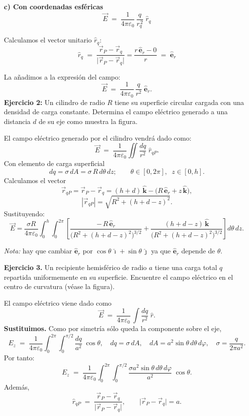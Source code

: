 \documentclass[a4paper,12pt]{article}
\begin{document}
\textbf{c) Con coordenadas esféricas}
\[
\vec E \;=\; \frac{1}{4\pi\varepsilon_0}\,\frac{q}{r_q^{\,2}}\;\hat r_q
\]

Calculamos el vector unitario $\hat r_q$:
\[
\hat r_q \;=\; \frac{\vec r_P-\vec r_q}{\lvert \vec r_P-\vec r_q\rvert}
= \frac{r\,\hat{\mathbf e}_r - 0}{r} \;=\; \hat{\mathbf e}_r
\]

La añadimos a la expresión del campo:
\[
\vec E \;=\; \frac{1}{4\pi\varepsilon_0}\,\frac{q}{r^{2}}\;\hat{\mathbf e}_r .
\]
\newpage
\noindent
\textbf{Ejercicio 2:} Un cilindro de radio \(R\) tiene su superficie circular cargada con una densidad de carga constante.
Determina el campo eléctrico generado a una distancia \(d\) de su eje como muestra la figura.

\medskip
\noindent
El campo eléctrico generado por el cilindro vendrá dado como:
\[
\vec E \;=\; \frac{1}{4\pi\varepsilon_0}\iint \frac{dq}{r^{2}}\;\hat r_{qP}.
\]
Con elemento de carga superficial
\[
dq=\sigma\,dA=\sigma\,R\,d\theta\,dz;
\qquad
\theta\in[0,2\pi],\;\; z\in[0,h].
\]
Calculamos el vector
\[
\vec r_{qP}=\vec r_P-\vec r_q
= (h+d)\,\hat{\mathbf k} - \big(R\,\hat{\mathbf e}_r + z\,\hat{\mathbf k}\big),
\]
\[
|\vec r_{qP}|=\sqrt{R^{2}+(h+d-z)^{2}}.
\]
Sustituyendo:
\[
\vec E
=\frac{\sigma R}{4\pi\varepsilon_0}
\int_{0}^{h}\!\!\int_{0}^{2\pi}
\left[
\frac{-\,R\,\hat{\mathbf e}_r}{\big(R^{2}+(h+d-z)^{2}\big)^{3/2}}
+\frac{(h+d-z)\,\hat{\mathbf k}}{\big(R^{2}+(h+d-z)^{2}\big)^{3/2}}
\right] d\theta\,dz .
\]

\textit{Nota:} hay que cambiar \(\hat{\mathbf e}_r\) por \(\cos\theta\,\hat{\imath}+\sin\theta\,\hat{\jmath}\) ya que \(\hat{\mathbf e}_r\) depende de \(\theta\).

\bigskip
\noindent
\textbf{Ejercicio 3.}
Un recipiente hemisférico de radio \(a\) tiene una carga total \(q\) repartida uniformemente en su superficie.
Encuentre el campo eléctrico en el centro de curvatura (véase la figura).

\medskip
\noindent
El campo eléctrico viene dado como
\[
\vec E \;=\; \frac{1}{4\pi\varepsilon_0}\,\int \frac{dq}{r^{2}}\;\hat r .
\]
\textbf{Sustituimos.} Como por simetría sólo queda la componente sobre el eje,
\[
E_z \;=\; \frac{1}{4\pi\varepsilon_0}
\int_{0}^{2\pi}\!\!\int_{0}^{\pi/2}
\frac{dq}{a^{2}}\;\cos\theta ,
\quad
dq=\sigma\,dA,\quad
dA=a^{2}\sin\theta\,d\theta\,d\varphi,
\quad
\sigma=\frac{q}{2\pi a^{2}} .
\]
Por tanto:
\[
E_z \;=\; \frac{1}{4\pi\varepsilon_0}
\int_{0}^{2\pi}\!\!\int_{0}^{\pi/2}
\frac{\sigma a^{2}\sin\theta\,d\theta\,d\varphi}{a^{2}}\;\cos\theta .
\]
Además,
\[
\hat r_{qP}\;=\;\frac{\vec r_{P}-\vec r_{q}}{\lvert \vec r_{P}-\vec r_{q}\rvert},
\qquad
\lvert \vec r_{P}-\vec r_{q}\rvert = a .
\]
\end{document}
